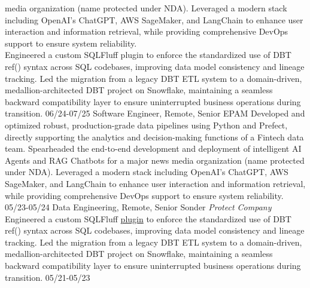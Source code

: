 \begin{entrylist}
  \entry
    {} %
    {} %
    {} %
    {%
    media organization (name protected under NDA). Leveraged a modern stack including OpenAI's ChatGPT,
    AWS SageMaker, and LangChain to enhance user interaction and information retrieval, while providing
    comprehensive DevOps support to ensure system reliability.\\
    Engineered a custom SQLFluff plugin %
    to enforce the standardized use of DBT ref() syntax across SQL codebases, improving data model consistency
    and lineage tracking. Led the migration from a legacy DBT ETL system to a domain-driven, medallion-architected
    DBT project on Snowflake, maintaining a seamless backward compatibility layer to ensure uninterrupted
    business operations during transition.
    }
  \entry
    {06/24-07/25}
    {Software Engineer, Remote, Senior}
    {EPAM}
    {Developed and optimized robust, production-grade data pipelines using Python and Prefect, directly
    supporting the analytics and decision-making functions of a Fintech data team. Spearheaded the
    end-to-end development and deployment of intelligent AI Agents and RAG Chatbots for a major news
    media organization (name protected under NDA). Leveraged a modern stack including OpenAI's ChatGPT,
    AWS SageMaker, and LangChain to enhance user interaction and information retrieval, while providing
    comprehensive DevOps support to ensure system reliability.}
  \entry
    {05/23-05/24}
    {Data Engineering, Remote, Senior}
    {Sonder {\sl Protect Company}}
    {Engineered a custom SQLFluff \href{http:\\https://github.com/juanfejara/sqlfluff-templ-check}{plugin}
    to enforce the standardized use of DBT ref() syntax across SQL codebases, improving data model consistency
    and lineage tracking. Led the migration from a legacy DBT ETL system to a domain-driven, medallion-architected
    DBT project on Snowflake, maintaining a seamless backward compatibility layer to ensure uninterrupted
    business operations during transition.}
  \entry
    {05/21-05/23}

\end{entrylist}
